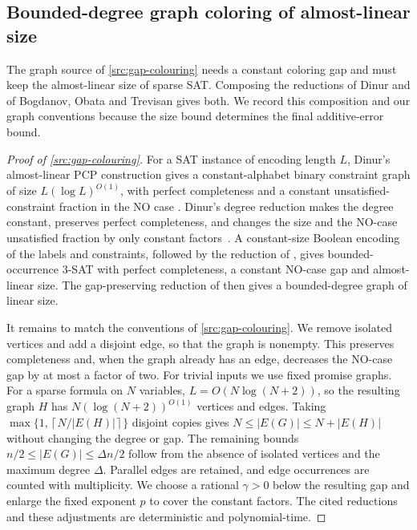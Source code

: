\documentclass[11pt,letterpaper]{article} \usepackage[utf8]{inputenc}
\theoremstyle{plain} \newtheorem{theorem}{Theorem}[section]
\theoremstyle{definition} \newaliascnt{definition}{theorem}
\newcommand{\ceil}[1]{\left\lceil#1\right\rceil}
\begin{document}
\subsection{Bounded-degree graph coloring of almost-linear size}
\label{app:graph-source}

The graph source of \cref{src:gap-colouring} needs a constant coloring gap
and must keep the almost-linear size of sparse SAT. Composing the reductions of
Dinur and of Bogdanov, Obata and Trevisan gives both. We record this composition
and our graph conventions because the size bound determines the final additive-error bound.

\begin{proof}[Proof of \cref{src:gap-colouring}]
\label{proof:src:gap-colouring}
For a SAT instance of encoding length $L$, Dinur's almost-linear PCP
construction gives a constant-alphabet binary constraint graph of size
$L(\log L)^{O(1)}$, with perfect completeness and a constant
unsatisfied-constraint fraction in the NO case
\cite[Lemma~8.3 and proof of Theorem~8.1]{dinur2007pcp}.
Dinur's degree reduction makes the degree constant, preserves perfect
completeness, and changes the size and the NO-case unsatisfied fraction by
only constant factors~\cite[Lemma~1.7]{dinur2007pcp}.
A constant-size Boolean encoding of the labels and constraints, followed by
the reduction of \citet*[Lemma~11]{bogdanov2002lower}, gives bounded-occurrence $3$-SAT
with perfect completeness, a constant NO-case gap and almost-linear size. The gap-preserving reduction of
\citet*[Theorem~14 and its proof, pp.~98--99]{bogdanov2002lower}
then gives a bounded-degree graph of linear size.

It remains to match the conventions of \cref{src:gap-colouring}. We remove isolated vertices and add a
disjoint edge, so that the graph is nonempty. This preserves completeness and, when the graph already has
an edge, decreases the NO-case gap by at most a factor of two. For trivial inputs we use fixed promise graphs.
For a sparse formula on $N$ variables, $L=O(N\log(N+2))$, so the resulting
graph $H$ has $N(\log(N+2))^{O(1)}$ vertices and edges. Taking
$\max\{1,\ceil{N/|E(H)|}\}$ disjoint copies gives
$N\le |E(G)|\le N+|E(H)|$ without changing the degree or gap.
The remaining bounds $n/2\le|E(G)|\le\Delta n/2$ follow from the absence of
isolated vertices and the maximum degree $\Delta$. Parallel edges are retained, and edge
occurrences are counted with multiplicity. We choose a rational $\gamma>0$
below the resulting gap and enlarge the fixed exponent $p$ to cover the
constant factors. The cited reductions and these adjustments are
deterministic and polynomial-time.
\end{proof}
\end{document}
